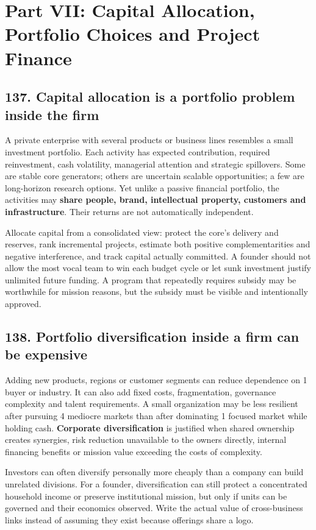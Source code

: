 \section{Part VII: Capital Allocation, Portfolio Choices and Project Finance}

\subsection{137. Capital allocation is a portfolio problem inside the firm}


A private enterprise with several products or business lines resembles a small investment portfolio. Each activity has expected contribution, required reinvestment, cash volatility, managerial attention and strategic spillovers. Some are stable core generators; others are uncertain scalable opportunities; a few are long-horizon research options. Yet unlike a passive financial portfolio, the activities may \textbf{share people, brand, intellectual property, customers and infrastructure}. Their returns are not automatically independent.

Allocate capital from a consolidated view: protect the core's delivery and reserves, rank incremental projects, estimate both positive complementarities and negative interference, and track capital actually committed. A founder should not allow the most vocal team to win each budget cycle or let sunk investment justify unlimited future funding. A program that repeatedly requires subsidy may be worthwhile for mission reasons, but the subsidy must be visible and intentionally approved.

\subsection{138. Portfolio diversification inside a firm can be expensive}


Adding new products, regions or customer segments can reduce dependence on 1 buyer or industry. It can also add fixed costs, fragmentation, governance complexity and talent requirements. A small organization may be less resilient after pursuing 4 mediocre markets than after dominating 1 focused market while holding cash. \textbf{Corporate diversification} is justified when shared ownership creates synergies, risk reduction unavailable to the owners directly, internal financing benefits or mission value exceeding the costs of complexity.

Investors can often diversify personally more cheaply than a company can build unrelated divisions. For a founder, diversification can still protect a concentrated household income or preserve institutional mission, but only if units can be governed and their economics observed. Write the actual value of cross-business links instead of assuming they exist because offerings share a logo.

